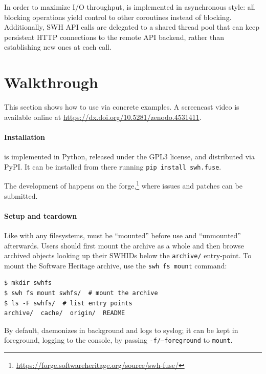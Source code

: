 In order to maximize I/O throughput, \SWHFS{} is implemented in asynchronous
style:
all blocking operations yield control to other coroutines instead of blocking.
%
Additionally, SWH API calls are delegated to a shared thread pool that can keep
persistent HTTP connections to the remote API backend, rather than establishing
new ones at each call.


\section{Walkthrough}%
\label{sec:fuse-walkthrough}

This section shows how to use \SWHFS{} via concrete examples. A screencast video
is available online at \url{https://dx.doi.org/10.5281/zenodo.4531411}.

\paragraph{Installation}

\SWHFS{} is implemented in Python, released under the GPL3 license, and
distributed via PyPI\@.
It can be installed from there running \texttt{pip install swh.fuse}.

The development of \SWHFS{} happens on the \SWH{}
forge,\footnote{\url{https://forge.softwareheritage.org/source/swh-fuse/}}
where issues and patches can be submitted.

\paragraph{Setup and teardown}

Like with any filesystems, \SWHFS{} must be ``mounted'' before use and
``unmounted'' afterwards. Users should first mount the \SWH{} archive as a whole
and then browse archived objects looking up their SWHIDs below the
\texttt{archive/} entry-point. To mount the Software Heritage archive, use the
\texttt{swh fs mount} command:

\begin{verbatim}
$ mkdir swhfs
$ swh fs mount swhfs/  # mount the archive
$ ls -F swhfs/  # list entry points
archive/  cache/  origin/  README
\end{verbatim}

By default, \SWHFS{} daemonizes in background and logs to syslog; it can be kept
in foreground, logging to the console, by passing \texttt{-f/--foreground} to
\texttt{mount}.

